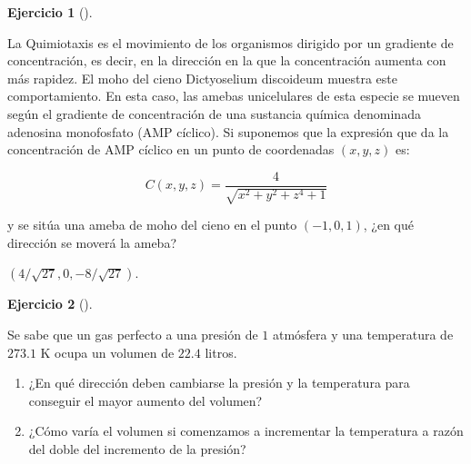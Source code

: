 \documentclass[
  a4paper,
]{scrreport}
\theoremstyle{definition}
\newtheorem{exercise}{Ejercicio}[chapter]
\theoremstyle{remark}
\begin{document}
\begin{exercise}[]\protect\hypertarget{exr-ameba}{}\label{exr-ameba}

La Quimiotaxis es el movimiento de los organismos dirigido por un
gradiente de concentración, es decir, en la dirección en la que la
concentración aumenta con más rapidez. El moho del cieno Dictyoselium
discoideum muestra este comportamiento. En esta caso, las amebas
unicelulares de esta especie se mueven según el gradiente de
concentración de una sustancia química denominada adenosina monofosfato
(AMP cíclico). Si suponemos que la expresión que da la concentración de
AMP cíclico en un punto de coordenadas \((x,y,z)\) es:

\[
C(x,y,z) = \frac{4} {{\sqrt {x^2  + y^2  + z^4  + 1} }}
\]

y se sitúa una ameba de moho del cieno en el punto \((-1,0,1)\), ¿en qué
dirección se moverá la ameba?

\end{exercise}

\begin{tcolorbox}[enhanced jigsaw, bottomrule=.15mm, breakable, colframe=quarto-callout-tip-color-frame, toprule=.15mm, opacityback=0, left=2mm, opacitybacktitle=0.6, colback=white, toptitle=1mm, titlerule=0mm, bottomtitle=1mm, arc=.35mm, title=\textcolor{quarto-callout-tip-color}{\faLightbulb}\hspace{0.5em}{Solución}, rightrule=.15mm, colbacktitle=quarto-callout-tip-color!10!white, leftrule=.75mm, coltitle=black]

\((4/\sqrt{27}, 0, -8/\sqrt{27})\).

\end{tcolorbox}

\begin{exercise}[]\protect\hypertarget{exr-derivada-direccional-gas-perfecto}{}\label{exr-derivada-direccional-gas-perfecto}

Se sabe que un gas perfecto a una presión de \(1\) atmósfera y una
temperatura de \(273.1\) K ocupa un volumen de \(22.4\) litros.

\begin{enumerate}
\def\labelenumi{\alph{enumi}.}
\item
  ¿En qué dirección deben cambiarse la presión y la temperatura para
  conseguir el mayor aumento del volumen?
\item
  ¿Cómo varía el volumen si comenzamos a incrementar la temperatura a
  razón del doble del incremento de la presión?
\end{enumerate}

\end{exercise}
\end{document}
